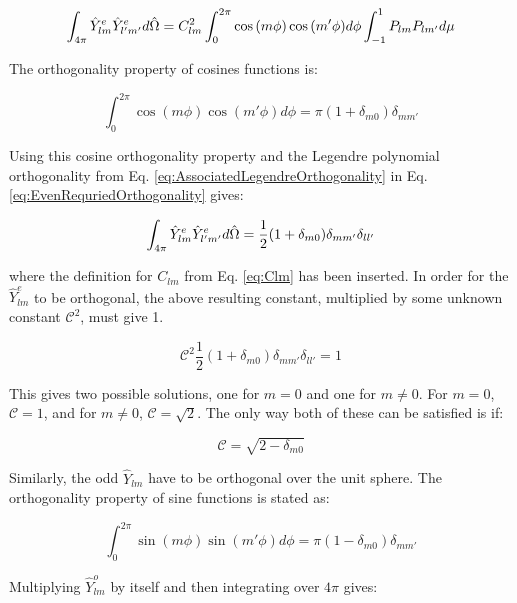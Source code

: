 \begin{tcolorbox}[breakable]
\begin{equation}
\label{eq:EvenRequriedOrthogonality}
\int_{4\pi}^{}\hat{Y}_{lm}^e\hat{Y}_{l'm'}^ed\hat{\Omega}  =C_{lm}^2\int_{0}^{2\pi}\cos{(m\phi)}\cos{(m'\phi)}d\phi\int_{-1}^{1}P_{lm}P_{lm'}d\mu
\end{equation}

The orthogonality property of cosines functions is:

\begin{equation}
\int_{0}^{2\pi}\cos{(m\phi)}\cos{(m'\phi)}d\phi=\pi(1+\delta_{m0})\delta_{mm'}
\end{equation}

Using this cosine orthogonality property and the Legendre polynomial orthogonality from Eq. \eqref{eq:AssociatedLegendreOrthogonality} in Eq. \eqref{eq:EvenRequriedOrthogonality} gives:

\begin{equation}
\label{eq:EvenRequriedOrthogonality2}
\int_{4\pi}^{}\hat{Y}_{lm}^e\hat{Y}_{l'm'}^ed\hat{\Omega}  =\frac{1}{2}(1+\delta_{m0})\delta_{mm'}\delta_{ll'}
\end{equation}

where the definition for \(C_{lm}\) from Eq. \eqref{eq:Clm} has been inserted. In order for the \(\hat{Y}_{lm}^e\) to be orthogonal, the above resulting constant, multiplied by some unknown constant \(\mathscr{C}^2\), must give 1. 

\begin{equation}
\mathscr{C}^2\frac{1}{2}(1+\delta_{m0})\delta_{mm'}\delta_{ll'}=1
\end{equation}

This gives two possible solutions, one for \(m=0\) and one for \(m\neq 0\). For \(m=0\), \(\mathscr{C}=1\), and for \(m\neq0\), \(\mathscr{C}=\sqrt{2}\). The only way both of these can be satisfied is if:

\begin{equation}
\mathscr{C}=\sqrt{2-\delta_{m0}}
\end{equation}

Similarly, the odd \(\hat{Y}_{lm}\) have to be orthogonal over the unit sphere. The orthogonality property of sine functions is stated as:

\begin{equation}
\label{eq:SineOrthogonality}
\int_{0}^{2\pi}\sin{(m\phi)}\sin{(m'\phi)}d\phi=\pi(1-\delta_{m0})\delta_{mm'}
\end{equation}

Multiplying \(\hat{Y}_{lm}^o\) by itself and then integrating over \(4\pi\) gives:


\end{tcolorbox}
